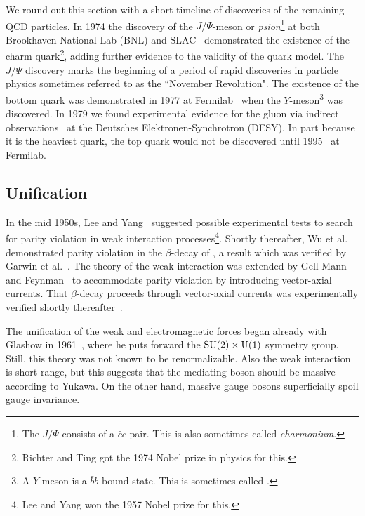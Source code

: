 We round out this section with a short timeline of discoveries of the
remaining QCD particles. In 1974 the discovery of the
$J/\Psi$-meson or {\it psion}\footnote{The $J/\Psi$ consists
of a $\bar{c}c$ pair. This is also sometimes called {\it charmonium}.
} at both Brookhaven National Lab (BNL) and
SLAC~\cite{augustin_discovery_1974,aubert_experimental_1974} demonstrated
the existence of the charm quark\footnote{Richter and Ting got the 1974
Nobel prize in physics for this.}, adding further evidence to
the validity of the quark model. The $J/\Psi$ discovery marks the beginning of a
period of rapid discoveries in particle physics sometimes referred to as the
``November Revolution". The existence of the bottom
quark was demonstrated in 1977 at Fermilab~\cite{herb_observation_1977} when the
$Y$-meson\footnote{A $Y$-meson is a $\bar{b}b$ bound state. This is
sometimes called .} was discovered.
In 1979 we found experimental evidence for the
gluon via indirect observations~\cite{barber_discovery_1979} at the
Deutsches Elektronen-Synchrotron (DESY). In part because it is the
heaviest quark, the top quark would not be discovered until
1995~\cite{abachi_observation_1995,abe_observation_1995}
at Fermilab.


\subsection{Unification}


In the mid 1950s, Lee and Yang~\cite{lee_question_1956} suggested possible
experimental tests to search for parity violation in weak interaction 
processes\footnote{Lee and Yang won the 1957 Nobel prize for this.}.
Shortly thereafter, Wu et al.~\cite{wu_experimental_1957} demonstrated parity
violation in the $\beta$-decay of ,
a result which was verified by Garwin et al.~\cite{garwin_observations_1957}. 
The theory of the weak interaction was extended by Gell-Mann and
Feynman~\cite{feynman_theory_1958} to accommodate parity violation by
introducing vector-axial currents.
That $\beta$-decay proceeds through vector-axial currents was
experimentally verified shortly thereafter~\cite{goldhaber_helicity_1958}.


The unification of the weak and electromagnetic forces began already with
Glashow in 1961~\cite{glashow_partial-symmetries_1961}, where
he puts forward the $\operatorname{SU}(2)\times \operatorname{U}(1)$ symmetry group. 
Still, this theory was not known to be renormalizable.
Also the weak interaction is short range, but this suggests that the mediating boson 
should be massive according to Yukawa. On the other hand, 
massive gauge bosons superficially spoil gauge invariance.


